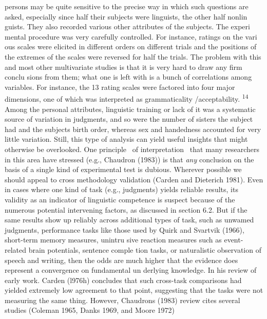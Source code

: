 \clearpage\setcounter{page}{1}\begin{styleTextbody}
{\textquotedbl}persons may be quite sensitive to the precise way in which such questions are asked,{\textquotedbl} especially since half their subjects were linguists, the other half nonlin\- guists. They also recorded various other attributes of the subjects. The experi\- mental procedure was very carefully controlled. For instance, ratings on the vari\- ous scales were elicited in different orders on different trials and the positions of the extremes of the scales were reversed for half the trials. The problem with this and most other multivariate studies is that it is very hard to draw any firm conclu\- sions from them; what one is left with is a bunch of correlations among variables. For instance, the 13 rating scales were factored into four major dimensions, one of which was interpreted as grammaticality /acceptability. \textsuperscript{14}\textsuperscript{ }Among the personal attributes, linguistic training or lack of it was a systematic source of variation in judgments, and so were the number of sisters the subject had and the subject{\textquotesingle}s birth order, whereas sex and handedness accounted for very little variation. Still, this type of analysis can yield useful insights that might otherwise be overlooked. One principle \ of interpretation \ that many researchers in this area have stressed (e.g., Chaudron (1983)) is that \textit{any}\textit{ }conclusion on the basis of a single kind of experimental test is dubious. Wherever possible we should appeal to cross\- methodology validation (Carden and Dieterich 1981). Even in cases where one kind of task (e.g., judgments) yields reliable results, its validity as an indicator of linguistic competence is suspect because of the numerous potential intervening factors, as discussed in section 6.2. But if the same results show up reliably across additional types of task, such as unwamed judgments, performance tasks like those used by Quirk and Svartvik (1966), short-term memory measures, unintru\- sive reaction measures such as event-related brain potentials, sentence comple\- tion tasks, or naturalistic observation of speech and writing, then the odds are much higher that the evidence does represent a convergence on fundamental un\- derlying knowledge. In his review of early work. Carden (l976h) concludes that such cross-task comparisons had yielded extremely low agreement to that point, suggesting that the tasks were not measuring the same thing. However, Chaudron{\textquotesingle}s (1983) review cites several studies (Coleman 1965, Danks 1969, and Moore 1972)
\end{styleTextbody}


